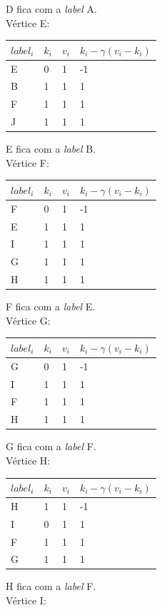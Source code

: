 \documentclass[a4paper,10pt]{report}
\begin{document}
  D fica com a \textit{label} A.
\\[0.25cm]
Vértice E:
  \begin{tabular}{| l | l | l | l |}
  \hline
  $label_i$ & $k_i$ & $v_i$ & $k_i - \gamma(v_i - k_i)$\\ \hline
  E & 0 & 1 & -1 \\ \hline
  B & 1 & 1 & 1  \\ \hline
  F & 1 & 1 & 1  \\ \hline
  J & 1 & 1 & 1  \\ \hline
  \end{tabular}  
  E fica com a \textit{label} B.
\\[0.25cm]
Vértice F:
  \begin{tabular}{| l | l | l | l |}
  \hline
  $label_i$ & $k_i$ & $v_i$ & $k_i - \gamma(v_i - k_i)$\\ \hline
  F & 0 & 1 & -1 \\ \hline
  E & 1 & 1 & 1  \\ \hline
  I & 1 & 1 & 1  \\ \hline
  G & 1 & 1 & 1  \\ \hline
  H & 1 & 1 & 1  \\ \hline
  \end{tabular}  
  F fica com a \textit{label} E.
\\[0.25cm]
Vértice G:
  \begin{tabular}{| l | l | l | l |}
  \hline
  $label_i$ & $k_i$ & $v_i$ & $k_i - \gamma(v_i - k_i)$\\ \hline
  G & 0 & 1 & -1  \\ \hline
  I & 1 & 1 & 1 \\ \hline
  F & 1 & 1 & 1  \\ \hline
  H & 1 & 1 & 1  \\ \hline
  \end{tabular}  
  G fica com a \textit{label} F.
\\[0.25cm]
Vértice H:
  \begin{tabular}{| l | l | l | l |}
  \hline
  $label_i$ & $k_i$ & $v_i$ & $k_i - \gamma(v_i - k_i)$\\ \hline
  H & 1 & 1 & -1  \\ \hline
  I & 0 & 1 & 1 \\ \hline
  F & 1 & 1 & 1  \\ \hline
  G & 1 & 1 & 1  \\ \hline
  \end{tabular}  
  H fica com a \textit{label} F.
\\[0.25cm]
Vértice I:
\end{document}
